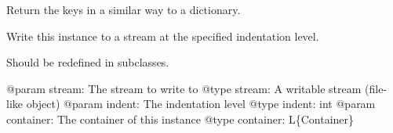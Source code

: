 \documentclass[a4paper,10pt,english]{sphinxmanual}
\begin{document}
\begin{fulllineitems}
\begin{fulllineitems}
\label{commands/apidoc/src:src.pyconf.Mapping.keys}
Return the keys in a similar way to a dictionary.

\end{fulllineitems}


\begin{fulllineitems}
\label{commands/apidoc/src:src.pyconf.Mapping.writeToStream}
Write this instance to a stream at the specified indentation level.

Should be redefined in subclasses.

@param stream: The stream to write to
@type stream: A writable stream (file-like object)
@param indent: The indentation level
@type indent: int
@param container: The container of this instance
@type container: L\{Container\}

\end{fulllineitems}


\end{fulllineitems}

\end{document}
